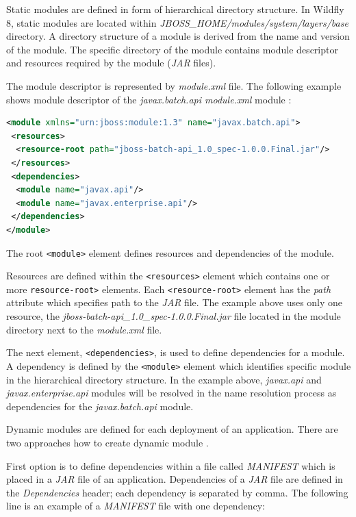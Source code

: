 \documentclass[12pt,oneside]{fithesis2}
\begin{document}
Static modules are defined in form of hierarchical directory structure. In Wildfly 8, static modules are located within \textit{JBOSS\_HOME/modules/system/layers/base} directory. A directory structure of a module is derived from the name and version of the module. The specific directory of the module contains module descriptor and resources required by the module (\textit{JAR} files).

The module descriptor is represented by \textit{module.xml} file. The following example shows module descriptor of the \textit{javax.batch.api module.xml} module \cite{wildfly_book}:
\begin{lstlisting}[caption = Example of a module descriptor, label = module_descriptor, language=XML]
<module xmlns="urn:jboss:module:1.3" name="javax.batch.api">
 <resources>
  <resource-root path="jboss-batch-api_1.0_spec-1.0.0.Final.jar"/>
 </resources>
 <dependencies>
  <module name="javax.api"/>
  <module name="javax.enterprise.api"/>
 </dependencies>    
</module>
\end{lstlisting}
\noindent	
The root \verb|<module>| element defines resources and dependencies of the module. 

Resources are defined within the \verb|<resources>| element which contains one or more \verb|resource-root>| elements. Each \verb|<resource-root>| element has the \textit{path} attribute which specifies path to the \textit{JAR} file. The example above uses only one resource, the \textit{jboss-batch-api\_1.0\_spec-1.0.0.Final.jar} file located in the module directory next to the \textit{module.xml} file.

The next element, \verb|<dependencies>|, is used to define dependencies for a module. A dependency is defined by the \verb|<module>| element which identifies specific module in the hierarchical directory structure. In the example above, \textit{javax.api} and \textit{javax.enterprise.api} modules will be resolved in the name resolution process as dependencies for the \textit{javax.batch.api} module.

Dynamic modules are defined for each deployment of an application. There are two approaches how to create dynamic module \cite{wildfly_book}.

First option is to define dependencies within a file called \textit{MANIFEST} which is placed in a \textit{JAR} file of an application. Dependencies of a \textit{JAR} file are defined in the \textit{Dependencies} header; each dependency is separated by comma. The following line is an example of a \textit{MANIFEST} file with one dependency:
\end{document}
